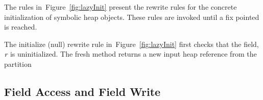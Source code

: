 \documentclass[11pt]{amsart}
\newcommand{\figref}[1]{Figure~\ref{#1}}
\begin{document}
The rules in~\figref{fig:lazyInit} present the rewrite rules for the
concrete initialization of symbolic heap objects.  These rules are
invoked until a fix pointed is reached. 

The initialize (null) rewrite rule in~\figref{fig:lazyInit} first
checks that the field, $\emph{r}$ is uninitialized. The fresh method
returns a new input heap reference from the partition 

\subsection{Field Access and Field Write}
\end{document}
